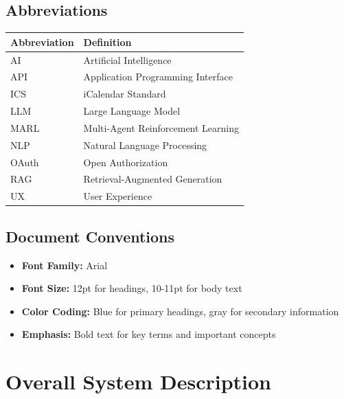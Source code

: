 \documentclass[12pt,a4paper]{article}
\begin{document}
\subsection{Abbreviations}

\begin{table}[htbp]
\centering
\begin{tabular}{L{3cm}L{10cm}}
    \toprule
    \textbf{Abbreviation} & \textbf{Definition} \\
    \midrule
    AI & Artificial Intelligence \\
    API & Application Programming Interface \\
    ICS & iCalendar Standard \\
    LLM & Large Language Model \\
    MARL & Multi-Agent Reinforcement Learning \\
    NLP & Natural Language Processing \\
    OAuth & Open Authorization \\
    RAG & Retrieval-Augmented Generation \\
    UX & User Experience \\
    \bottomrule
\end{tabular}
\end{table}

\subsection{Document Conventions}

\begin{itemize}[leftmargin=*, itemsep=0.3em]
    \item \textbf{Font Family:} Arial
    \item \textbf{Font Size:} 12pt for headings, 10-11pt for body text
    \item \textbf{Color Coding:} Blue for primary headings, gray for secondary information
    \item \textbf{Emphasis:} Bold text for key terms and important concepts
\end{itemize}

\section{Overall System Description}
\end{document}
